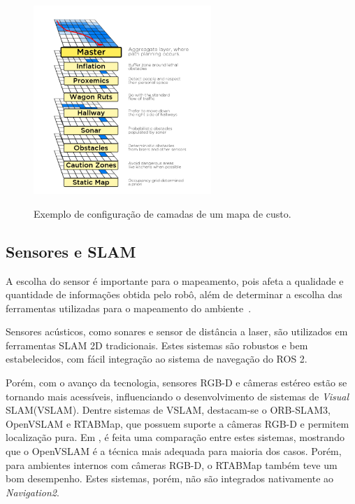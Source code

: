 \documentclass[repeatfields,xlists,xpacks,oneside,yearsonly]{ufrgscca}
\begin{document}
\begin{figure}[htbp]
    {
        \centering
        \caption{Exemplo de configuração de camadas de um mapa de custo.}
        \label{fig:mapa_camadas}
        \includegraphics[width=0.6\textwidth]{mapa_camadas.png}\\
    }
    {}
\end{figure}

\subsection{Sensores e SLAM}

A escolha do sensor é importante para o mapeamento,
pois afeta a qualidade e quantidade de informações obtida pelo robô, além
de determinar a escolha das ferramentas utilizadas para o mapeamento do
ambiente~\cite{SensorAndSLAM}.

Sensores acústicos, como sonares e sensor de distância a laser, são utilizados
em ferramentas SLAM 2D tradicionais. Estes sistemas são robustos e bem estabelecidos,
com fácil integração ao sistema de navegação do ROS 2.

Porém, com o avanço da tecnologia, sensores RGB-D e câmeras estéreo estão se tornando
mais acessíveis, influenciando o desenvolvimento de sistemas de \textit{Visual} SLAM(VSLAM).
Dentre sistemas de VSLAM, destacam-se o ORB-SLAM3, OpenVSLAM e RTABMap, que possuem suporte
a câmeras RGB-D e permitem localização pura.
Em \textcite{VSLAM}, é feita uma comparação entre estes sistemas, mostrando que o
OpenVSLAM é a técnica mais adequada para maioria dos casos.
Porém, para ambientes internos com câmeras RGB-D, o RTABMap também teve um bom desempenho.
Estes sistemas, porém, não são integrados nativamente ao \textit{Navigation2}.
\end{document}
